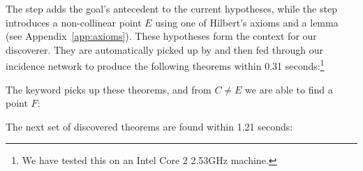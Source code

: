 The  step adds the goal's antecedent to the current hypotheses, while the  step introduces a non-collinear point $E$ using one of Hilbert's axioms and a lemma  (see Appendix~\ref{app:axioms}). These hypotheses form the context for our discoverer. They are automatically picked up by  and then fed through our incidence network to produce the following theorems within 0.31 seconds:\footnote{We have tested this on an Intel Core 2 2.53GHz machine.}

\vspace{0.2cm}
\noindent{}
\vspace{0.1cm}

The  keyword picks up these theorems, and from $C\neq E$ we are able to find a point $F$:

\vspace{0.2cm}
\noindent{}
\vspace{0.1cm}

The next set of discovered theorems are found within 1.21 seconds:

\vspace{0.2cm}
\noindent{}
\vspace{0.1cm}

